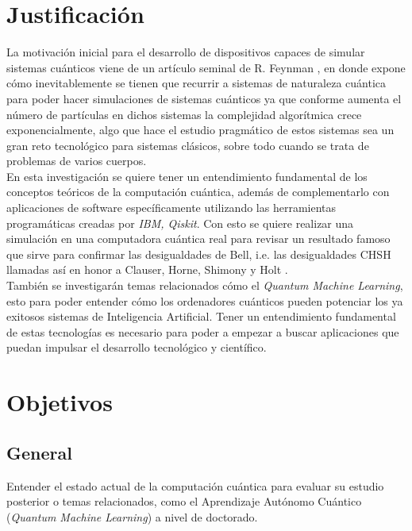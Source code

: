 \documentclass[a4paper]{article}
\begin{document}
\section{Justificación}
La motivación inicial para el desarrollo de dispositivos capaces de simular sistemas cuánticos viene de un artículo seminal de R. Feynman \cite{Feynman}, en donde expone cómo inevitablemente se tienen que recurrir a sistemas de naturaleza cuántica para poder hacer simulaciones de sistemas cuánticos ya que conforme aumenta el número de partículas en dichos sistemas la complejidad algorítmica crece exponencialmente, algo que hace el estudio pragmático de estos sistemas sea un gran reto tecnológico para sistemas clásicos, sobre todo cuando se trata de problemas de varios cuerpos.\\

En esta investigación se quiere tener un entendimiento fundamental de los conceptos teóricos de la computación cuántica, además de complementarlo con aplicaciones de software específicamente utilizando las herramientas programáticas creadas por \textit{IBM, Qiskit}. Con esto se quiere realizar una simulación en una computadora cuántica real para revisar un resultado famoso que sirve para confirmar las desigualdades de Bell, i.e. las desigualdades CHSH llamadas así en honor a Clauser, Horne, Shimony y Holt \cite{Clauser}.\\

También se investigarán temas relacionados cómo el \textit{Quantum Machine Learning}, esto para poder entender cómo los ordenadores cuánticos pueden potenciar los ya exitosos sistemas de Inteligencia Artificial. Tener un entendimiento fundamental de estas tecnologías es necesario para poder a empezar a buscar aplicaciones que puedan impulsar el desarrollo tecnológico y científico.
\section{Objetivos}
\subsection{General}
Entender el estado actual de la computación cuántica para evaluar su estudio posterior o temas relacionados, como el Aprendizaje Autónomo Cuántico (\emph{Quantum Machine Learning}) a nivel de doctorado.
\end{document}
